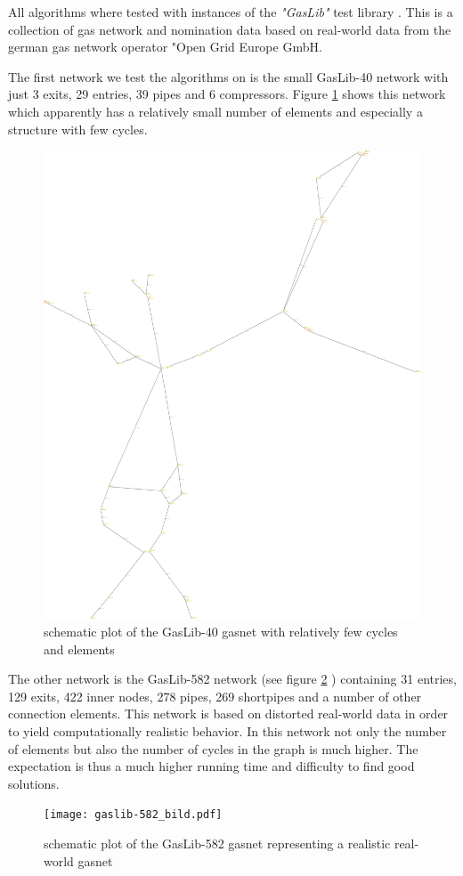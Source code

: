 All algorithms where tested with instances of the \textit{"GasLib"} test library \cite{gaslib}. This is a 
collection of gas network and nomination data based on real-world data from the german gas network operator "Open Grid 
Europe GmbH. 

The first network we test the algorithms on is the small GasLib-40 network with just 3 exits, 29 entries, 39 
pipes and 6 compressors. Figure \ref{bild:gaslib40} shows this network which apparently has a relatively small number 
of elements and especially a structure with few cycles.

\begin{figure}[h!, scale = 0.6]
  \centering
  \includegraphics[width=.6\textwidth]{gaslib-40_bild.pdf}
  \caption{schematic plot of the GasLib-40 gasnet with relatively few cycles and elements}
  \label{bild:gaslib40}
\end{figure}


The other network is the GasLib-582 network (see figure \ref{bild:gaslib582} ) containing 31 entries, 129 exits, 422 
inner nodes, 278 pipes, 269 shortpipes and a number of other connection elements. This network is based on distorted 
real-world data in order to yield computationally realistic behavior. In this network not only the number of elements 
but also the number of cycles in the graph is much higher. The expectation is thus a much higher running time and 
difficulty to find good solutions. \\

\begin{figure}[h!, scale = 0.6]
  \centering
  \texttt{[image: gaslib-582\_bild.pdf]}
  \caption{schematic plot of the GasLib-582 gasnet representing a realistic real-world gasnet}
  \label{bild:gaslib582}
\end{figure}

